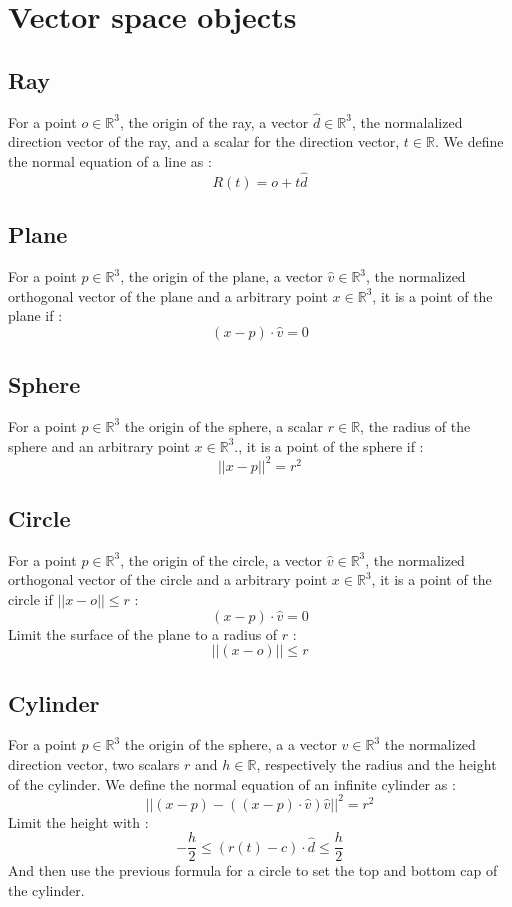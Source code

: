 \documentclass{ft-article}
\begin{document}
\section{Vector space objects}
	\subsection{Ray}
		For a point $o \in \mathbb{R}^3$, the origin of the ray, a vector 
		$\hat{d} \in \mathbb{R}^3$, the normalalized direction vector of the ray, 
		and a scalar for the direction vector, $t \in \mathbb{R}$. We define 
		the normal equation of a line as :
		$$R(t) = o + t\hat{d}$$
	\subsection{Plane}
		For a point $p \in \mathbb{R}^3$, the origin of the plane, 
		a vector $\hat{v} \in \mathbb{R}^3$, the normalized orthogonal vector 
		of the plane and a arbitrary point $x \in \mathbb{R}^3$, it is a point 
		of the plane if :
		$$(x - p) \cdot \hat{v} = 0$$
	\subsection{Sphere}
		For a point $p \in \mathbb{R}^3$ the origin of the sphere, a scalar 
		$r \in \mathbb{R}$, the radius of the sphere and an arbitrary point 
		$x \in \mathbb{R}^3$., it is a point of the sphere if :
		$$|| x - p ||^2 = r^2$$
	\subsection{Circle}
		For a point $p \in \mathbb{R}^3$, the origin of the circle, 
		a vector $\hat{v} \in \mathbb{R}^3$, the normalized orthogonal vector 
		of the circle and a arbitrary point $x \in \mathbb{R}^3$, it is a point 
		of the circle if $|| x - o || \leq r$ :
		$$(x - p) \cdot \hat{v} = 0$$
		Limit the surface of the plane to a radius of $r$ :
		$$||(x - o)|| \leq r$$
	\subsection{Cylinder}
		For a point $p \in \mathbb{R}^3$ the origin of the sphere, a 
		a vector $\hat{v} \in \mathbb{R}^3$ the normalized direction vector, 
		two scalars $r$ and $h \in \mathbb{R}$, respectively the radius and the 
		height of the cylinder. We define the normal equation of an infinite 
		cylinder as :
		$$||(x - p) - ((x - p) \cdot \hat{v}) \hat{v}||^2 = r^2$$
		Limit the height with :
		$$-\dfrac{h}{2} \leq (r(t) - c) \cdot \hat{d} \leq \dfrac{h}{2}$$
		And then use the previous formula for a circle to set the top and bottom 
		cap of the cylinder.
\end{document}
